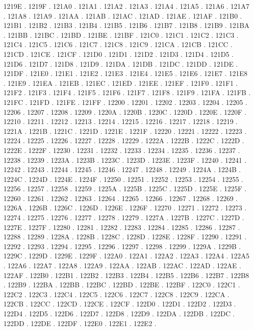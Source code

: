 1219E .
1219F .
121A0 .
121A1 .
121A2 .
121A3 .
121A4 .
121A5 .
121A6 .
121A7 .
121A8 .
121A9 .
121AA .
121AB .
121AC .
121AD .
121AE .
121AF .
121B0 .
121B1 .
121B2 .
121B3 .
121B4 .
121B5 .
121B6 .
121B7 .
121B8 .
121B9 .
121BA .
121BB .
121BC .
121BD .
121BE .
121BF .
121C0 .
121C1 .
121C2 .
121C3 .
121C4 .
121C5 .
121C6 .
121C7 .
121C8 .
121C9 .
121CA .
121CB .
121CC .
121CD .
121CE .
121CF .
121D0 .
121D1 .
121D2 .
121D3 .
121D4 .
121D5 .
121D6 .
121D7 .
121D8 .
121D9 .
121DA .
121DB .
121DC .
121DD .
121DE .
121DF .
121E0 .
121E1 .
121E2 .
121E3 .
121E4 .
121E5 .
121E6 .
121E7 .
121E8 .
121E9 .
121EA .
121EB .
121EC .
121ED .
121EE .
121EF .
121F0 .
121F1 .
121F2 .
121F3 .
121F4 .
121F5 .
121F6 .
121F7 .
121F8 .
121F9 .
121FA .
121FB .
121FC .
121FD .
121FE .
121FF .
12200 .
12201 .
12202 .
12203 .
12204 .
12205 .
12206 .
12207 .
12208 .
12209 .
1220A .
1220B .
1220C .
1220D .
1220E .
1220F .
12210 .
12211 .
12212 .
12213 .
12214 .
12215 .
12216 .
12217 .
12218 .
12219 .
1221A .
1221B .
1221C .
1221D .
1221E .
1221F .
12220 .
12221 .
12222 .
12223 .
12224 .
12225 .
12226 .
12227 .
12228 .
12229 .
1222A .
1222B .
1222C .
1222D .
1222E .
1222F .
12230 .
12231 .
12232 .
12233 .
12234 .
12235 .
12236 .
12237 .
12238 .
12239 .
1223A .
1223B .
1223C .
1223D .
1223E .
1223F .
12240 .
12241 .
12242 .
12243 .
12244 .
12245 .
12246 .
12247 .
12248 .
12249 .
1224A .
1224B .
1224C .
1224D .
1224E .
1224F .
12250 .
12251 .
12252 .
12253 .
12254 .
12255 .
12256 .
12257 .
12258 .
12259 .
1225A .
1225B .
1225C .
1225D .
1225E .
1225F .
12260 .
12261 .
12262 .
12263 .
12264 .
12265 .
12266 .
12267 .
12268 .
12269 .
1226A .
1226B .
1226C .
1226D .
1226E .
1226F .
12270 .
12271 .
12272 .
12273 .
12274 .
12275 .
12276 .
12277 .
12278 .
12279 .
1227A .
1227B .
1227C .
1227D .
1227E .
1227F .
12280 .
12281 .
12282 .
12283 .
12284 .
12285 .
12286 .
12287 .
12288 .
12289 .
1228A .
1228B .
1228C .
1228D .
1228E .
1228F .
12290 .
12291 .
12292 .
12293 .
12294 .
12295 .
12296 .
12297 .
12298 .
12299 .
1229A .
1229B .
1229C .
1229D .
1229E .
1229F .
122A0 .
122A1 .
122A2 .
122A3 .
122A4 .
122A5 .
122A6 .
122A7 .
122A8 .
122A9 .
122AA .
122AB .
122AC .
122AD .
122AE .
122AF .
122B0 .
122B1 .
122B2 .
122B3 .
122B4 .
122B5 .
122B6 .
122B7 .
122B8 .
122B9 .
122BA .
122BB .
122BC .
122BD .
122BE .
122BF .
122C0 .
122C1 .
122C2 .
122C3 .
122C4 .
122C5 .
122C6 .
122C7 .
122C8 .
122C9 .
122CA .
122CB .
122CC .
122CD .
122CE .
122CF .
122D0 .
122D1 .
122D2 .
122D3 .
122D4 .
122D5 .
122D6 .
122D7 .
122D8 .
122D9 .
122DA .
122DB .
122DC .
122DD .
122DE .
122DF .
122E0 .
122E1 .
122E2 .
